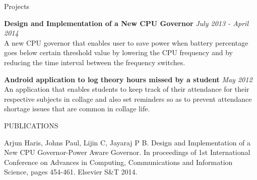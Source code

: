 \documentclass{resume} %
\begin{document}




\begin{rSection}{Projects}

{\bf Design and Implementation of a New CPU Governor} \hfill {\em July 2013 - April 2014} \\ 
A new CPU governor that enables user to save power when battery percentage goes below certain threshold value by lowering the CPU frequency and by reducing the time interval between the frequency switches.

{\bf Android application to log theory hours missed by a student} \hfill {\em May 2012} \\ 
An application that enables students to keep track of their attendance for their respective subjects in collage and also set reminders so as to prevent attendance shortage issues that are common in collage life.
\end{rSection}


\begin{rSection}{PUBLICATIONS}

Arjun Haris, Johns Paul, Lijin C, Jayaraj P B. Design and Implementation of a New CPU Governor-Power Aware Governor. In proceedings of 1st International Conference on Advances in Computing, Communications and Information Science, pages 454-461. Elsevier S\&T 2014.


\end{rSection}

\end{document}
